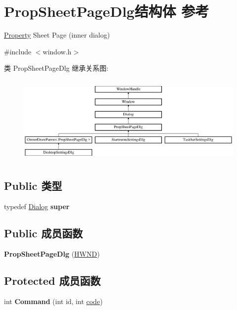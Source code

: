\hypertarget{struct_prop_sheet_page_dlg}{}\section{Prop\+Sheet\+Page\+Dlg结构体 参考}
\label{struct_prop_sheet_page_dlg}


\hyperlink{struct_property}{Property} Sheet Page (inner dialog)  




{\ttfamily \#include $<$window.\+h$>$}

类 Prop\+Sheet\+Page\+Dlg 继承关系图\+:\begin{figure}[H]
\begin{center}
\leavevmode
\includegraphics[height=4.375000cm]{struct_prop_sheet_page_dlg}
\end{center}
\end{figure}
\subsection*{Public 类型}
\begin{DoxyCompactItemize}
\item 
\mbox{\label{struct_prop_sheet_page_dlg_a6e00bb2500663a9df6c05c7062fd869a}} 
typedef \hyperlink{struct_dialog}{Dialog} {\bfseries super}
\end{DoxyCompactItemize}
\subsection*{Public 成员函数}
\begin{DoxyCompactItemize}
\item 
\mbox{\label{struct_prop_sheet_page_dlg_af55e19d62ecd022f7c0201359134aea6}} 
{\bfseries Prop\+Sheet\+Page\+Dlg} (\hyperlink{interfacevoid}{H\+W\+ND})
\end{DoxyCompactItemize}
\subsection*{Protected 成员函数}
\begin{DoxyCompactItemize}
\item 
\mbox{\label{struct_prop_sheet_page_dlg_a523b72bc7255c2b935794c00a4149be9}} 
int {\bfseries Command} (int id, int \hyperlink{structcode}{code})
\end{DoxyCompactItemize}
